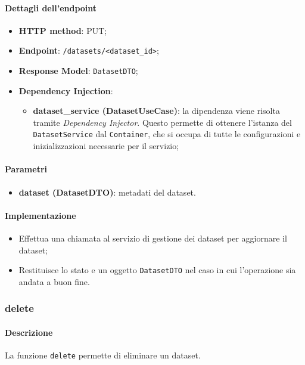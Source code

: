 \paragraph{Dettagli dell'endpoint}
\begin{itemize}
    \item \textbf{HTTP method}: PUT;
    \item \textbf{Endpoint}: \texttt{/datasets/<dataset\_id>};
    \item \textbf{Response Model}: \texttt{DatasetDTO};
    \item \textbf{Dependency Injection}: 
    \begin{itemize}
        \item \textbf{dataset\_service (DatasetUseCase)}: la dipendenza viene risolta tramite \textit{Dependency Injector}. Questo permette di ottenere l'istanza del \texttt{DatasetService} dal \texttt{Container}, che si occupa di tutte le configurazioni e inizializzazioni necessarie per il servizio;
    \end{itemize}
\end{itemize}
\paragraph{Parametri}
\begin{itemize}
    \item \textbf{dataset (DatasetDTO)}: metadati del dataset.
\end{itemize}
\paragraph{Implementazione}
\begin{itemize}
    \item Effettua una chiamata al servizio di gestione dei dataset per aggiornare il dataset;
    \item Restituisce lo stato e un oggetto \texttt{DatasetDTO} nel caso in cui l'operazione sia andata a buon fine.
\end{itemize}

\subsubsection{delete}
\paragraph{Descrizione}
La funzione \texttt{delete} permette di eliminare un dataset.
